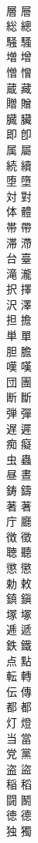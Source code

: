 \documentclass[8pt]{extreport}
\begin{document}
\begin{CJK}{UTF8}{min}
\\	層	層
\\	総	總
\\	騒	騷
\\	増	增
\\	憎	憎
\\	蔵	藏
\\	贈	贈
\\	臓	臟
\\	即	卽
\\	属	屬
\\	続	續
\\	堕	墮
\\	対	對
\\	体	體
\\	帯	帶
\\	滞	滯
\\	台	臺
\\	滝	瀧
\\	択	擇
\\	沢	澤
\\	担	擔
\\	単	單
\\	胆	膽
\\	嘆	嘆
\\	団	團
\\	断	斷
\\	弾	彈
\\	遅	遲
\\	痴	癡
\\	虫	蟲
\\	昼	晝
\\	鋳	鑄
\\	著	著
\\	庁	廳
\\	徴	徵
\\	聴	聽
\\	懲	懲
\\	勅	敕
\\	鎮	鎭
\\	塚	塚
\\	逓	遞
\\	鉄	鐵
\\	点	點
\\	転	轉
\\	伝	傳
\\	都	都
\\	灯	燈
\\	当	當
\\	党	黨
\\	盗	盜
\\	稲	稻
\\	闘	鬭
\\	徳	德
\\	独	獨

\end{CJK}
\end{document}
